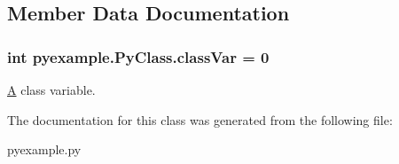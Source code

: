 \subsection{Member Data Documentation}
\hypertarget{classpyexample_1_1PyClass_abd17aff54e5b0ca194020c796c733546}{
\subsubsection[{class\-Var}]{\setlength{\rightskip}{0pt plus 5cm}int pyexample.\-Py\-Class.\-class\-Var = 0\hspace{0.3cm}{\ttfamily [static]}}}\label{classpyexample_1_1PyClass_abd17aff54e5b0ca194020c796c733546}


\hyperlink{classA}{A} class variable. 



The documentation for this class was generated from the following file\-:\begin{DoxyCompactItemize}
\item 
pyexample.\-py\end{DoxyCompactItemize}
